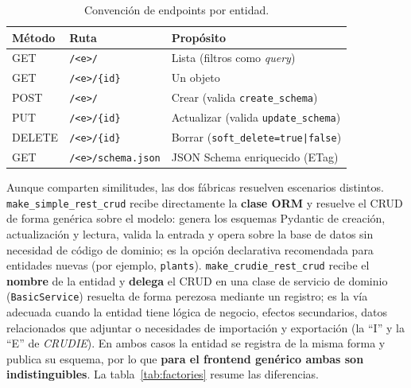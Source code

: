 \begin{table}[!htbp]
\caption{Convención de endpoints por entidad.}
\label{tab:endpoints}
\centering
\begin{tabular}{|l|l|p{5.2cm}|}
\hline
\textbf{Método} & \textbf{Ruta} & \textbf{Propósito} \\ \hline
GET & \texttt{/<e>/} & Lista (filtros como \emph{query}) \\ \hline
GET & \texttt{/<e>/\{id\}} & Un objeto \\ \hline
POST & \texttt{/<e>/} & Crear (valida \texttt{create\_schema}) \\ \hline
PUT & \texttt{/<e>/\{id\}} & Actualizar (valida \texttt{update\_schema}) \\ \hline
DELETE & \texttt{/<e>/\{id\}} & Borrar (\texttt{soft\_delete=true|false}) \\ \hline
GET & \texttt{/<e>/schema.json} & JSON Schema enriquecido (ETag) \\ \hline
\end{tabular}
\end{table}

Aunque comparten similitudes, las dos fábricas resuelven escenarios distintos.
\texttt{make\_\allowbreak simple\_\allowbreak rest\_\allowbreak crud} recibe directamente la \textbf{clase ORM} y
resuelve el CRUD de forma genérica sobre el modelo: genera los esquemas Pydantic
de creación, actualización y lectura, valida la entrada y opera sobre la base de
datos sin necesidad de código de dominio; es la opción declarativa recomendada
para entidades nuevas (por ejemplo, \texttt{plants}).
\texttt{make\_\allowbreak crudie\_\allowbreak rest\_\allowbreak crud} recibe el \textbf{nombre} de la entidad y
\textbf{delega} el CRUD en una clase de servicio de dominio
(\texttt{BasicService}) resuelta de forma perezosa mediante un registro; es la
vía adecuada cuando la entidad tiene lógica de negocio, efectos secundarios,
datos relacionados que adjuntar o necesidades de importación y exportación (la
``I'' y la ``E'' de \emph{CRUDIE}). En ambos casos la entidad se registra de la
misma forma y publica su esquema, por lo que \textbf{para el frontend genérico
ambas son indistinguibles}. La tabla~\ref{tab:factories} resume las diferencias.

